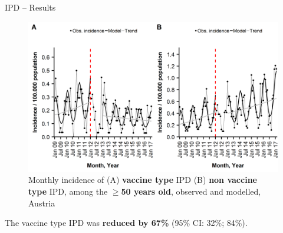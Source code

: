 \documentclass[table]{beamer}\usepackage[]{graphicx}\usepackage[]{color}
\begin{document}
\begin{frame}[fragile]{IPD -- Results}
\begin{center}
\begin{figure}
  \centering
  \caption{Monthly incidence of (A) \textbf{vaccine type} IPD (B) \textbf{non vaccine type} IPD, among the \textbf{$\ge$50 years old}, observed and modelled, Austria}
  \includegraphics[width=\textwidth,height=0.5\textheight,keepaspectratio]{richter2019_Fig3.png}
\end{figure}
\end{center}
The vaccine type IPD was \textbf{reduced by 67\%} (95\% CI: 32\%; 84\%).
\vfill
{\scriptsize \cite{richter2019}}
\end{frame}
\end{document}
